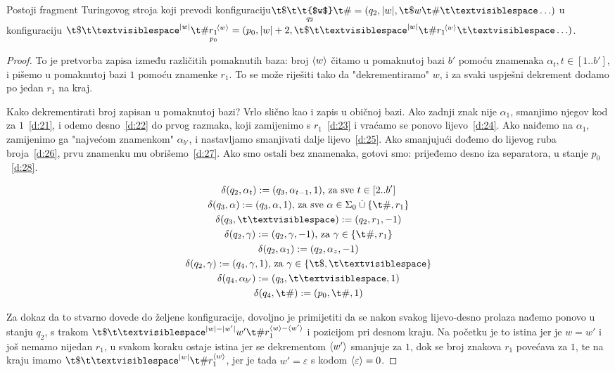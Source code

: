 \begin{lema}[{name=[drugi fragment transpiliranog stroja]}]\label{lm:faza2}
Postoji fragment Turingovog stroja koji prevodi konfiguraciju\newline $\T{\$}{q_2}{\t{$w$}}{\#}=(q_2,\dulj w,\t\$w\t\#\bl\ldots)$ u konfiguraciju $\t\$\bl^{\dulj w}\t\#\underset{\mathclap{p_0}}{r_1}^{\!\kr w}=(p_0,\dulj w+2,\t\$\bl^{\dulj w}\t\#r_1{}^{\!\kr w}\bl\ldots)$.
\end{lema}
\begin{proof}
To je pretvorba zapisa između različitih pomaknutih baza: broj $\langle w\rangle$ čitamo u pomaknutoj bazi $b'$ pomoću znamenaka $\alpha_t,t\in[1..b']$, i pišemo u pomaknutoj bazi $1$ pomoću znamenke $r_1$. To se može riješiti tako da "dekrementiramo" $w$, i za svaki uspješni dekrement dodamo po jedan $r_1$ na kraj.

Kako dekrementirati broj zapisan u pomaknutoj bazi? Vrlo slično kao i zapis u običnoj bazi. Ako zadnji znak nije $\alpha_1$, smanjimo njegov kod za $1$~\eqref{d:21}, i odemo desno~\eqref{d:22} do prvog razmaka, koji zamijenimo s $r_1$~\eqref{d:23} i vraćamo se ponovo lijevo~\eqref{d:24}. Ako naiđemo na $\alpha_1$, zamijenimo ga "najvećom znamenkom" $\alpha_{b'}$, i nastavljamo smanjivati dalje lijevo~\eqref{d:25}. Ako smanjujući dođemo do lijevog ruba broja~\eqref{d:26}, prvu znamenku mu obrišemo~\eqref{d:27}. Ako smo ostali bez znamenaka, gotovi smo: prijeđemo desno iza separatora, u stanje $p_0$~\eqref{d:28}.

\noindent\begin{gather}
\label{d:21}\delta(q_2,\alpha_t):=(q_3,\alpha_{t-1},1)\text{, za sve }t\in[2..b']\\
\label{d:22}\delta(q_3,\alpha):=(q_3,\alpha,1)\text{, za sve }\alpha\in\Sigma_0\mathbin{\dot\cup}\{\t\#,r_1\}\\
\label{d:23}\delta(q_3,\bl):=(q_2,r_1,-1)\\
\label{d:24}\delta(q_2,\gamma):=(q_2,\gamma,-1)\text{, za }\gamma\in\{\t\#,r_1\}\\
\label{d:25}\delta(q_2,\alpha_1):=(q_2,\alpha_z,-1)\\
\label{d:26}\delta(q_2,\gamma):=(q_4,\gamma,1)\text{, za }\gamma\in\{\t\$,\bl\}\\
\label{d:27}\delta(q_4,\alpha_{b'}):=(q_3,\bl,1)\\
\label{d:28}\delta(q_4,\t\#):=(p_0,\t\#,1)
\end{gather}

Za dokaz da to stvarno dovede do željene konfiguracije, dovoljno je primijetiti da se nakon svakog lijevo-desno prolaza nađemo ponovo u stanju $q_2$, s trakom $\t\$\bl^{\dulj w-\dulj{w'}}w'\t\#r_1^{\kr w-\kr{w'}}$ i pozicijom pri desnom kraju. Na početku je to istina jer je $w=w'$ i još nemamo nijedan $r_1$, u svakom koraku ostaje istina jer se dekrementom $\langle w'\rangle$ smanjuje za $1$, dok se broj znakova $r_1$ povećava za $1$, te na kraju imamo $\t\$\bl^{\dulj w}\t\#r_1^{\kr w}$, jer je tada $w'=\varepsilon$ s kodom $\langle\varepsilon\rangle=0$.
\end{proof}

